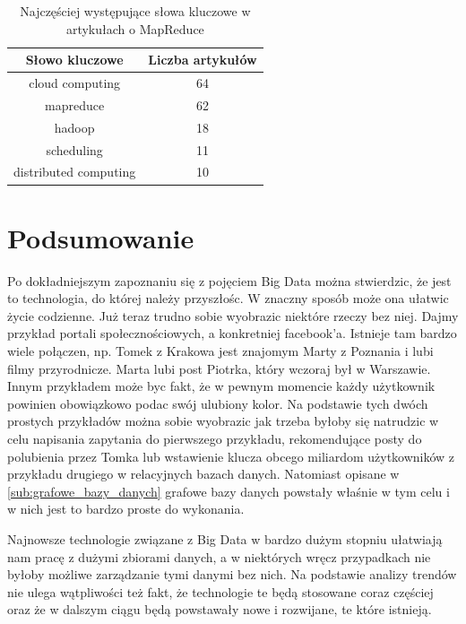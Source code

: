 \documentclass[twocolumn]{svjour3}          %
\begin{document}
\begin{table}[t]
    \centering
    \caption{Najczęściej występujące słowa kluczowe w artykułach o MapReduce}
    \label{tabela_mapreduce}
    \begin{tabular}{|c|c|}
        \hline 
        Słowo kluczowe & Liczba artykułów\\
        \hline
        cloud computing & 64 \\
        \hline
        mapreduce & 62 \\
        \hline
        hadoop & 18 \\
        \hline
        scheduling & 11 \\
        \hline
        distributed computing & 10 \\
        \hline
    \end{tabular}
\end{table}



\newpage
\newpage
\newpage

\section{Podsumowanie}
\label{sec:podsumowanie}
Po dokładniejszym zapoznaniu się z pojęciem Big Data można stwierdzic, że jest to technologia, do której należy przyszłośc. W znaczny sposób może ona ułatwic życie codzienne. Już teraz trudno sobie wyobrazic niektóre rzeczy bez niej. Dajmy przykład portali społecznościowych, a konkretniej facebook'a. Istnieje tam bardzo wiele połączen, np. Tomek z Krakowa jest znajomym Marty z Poznania i lubi filmy przyrodnicze. Marta lubi post Piotrka, który wczoraj był w Warszawie. Innym przykładem może byc fakt, że w pewnym momencie każdy użytkownik powinien obowiązkowo podac swój ulubiony kolor. Na podstawie tych dwóch prostych przykładów można sobie wyobrazic jak trzeba byłoby się natrudzic w celu napisania zapytania do pierwszego przykładu, rekomendujące posty do polubienia przez Tomka lub wstawienie klucza obcego miliardom użytkowników z przykładu drugiego w relacyjnych bazach danych. Natomiast opisane w \ref{sub:grafowe_bazy_danych} grafowe bazy danych powstały właśnie w tym celu i w nich jest to bardzo proste do wykonania.

Najnowsze technologie związane z Big Data w bardzo dużym stopniu ułatwiają nam pracę z dużymi zbiorami danych, a w niektórych wręcz przypadkach nie byłoby możliwe zarządzanie tymi danymi bez nich. Na podstawie analizy trendów nie ulega wątpliwości też fakt, że technologie te będą stosowane coraz częściej oraz że w dalszym ciągu będą powstawały nowe i rozwijane, te które istnieją. 

\nocite{*}


\end{document}
